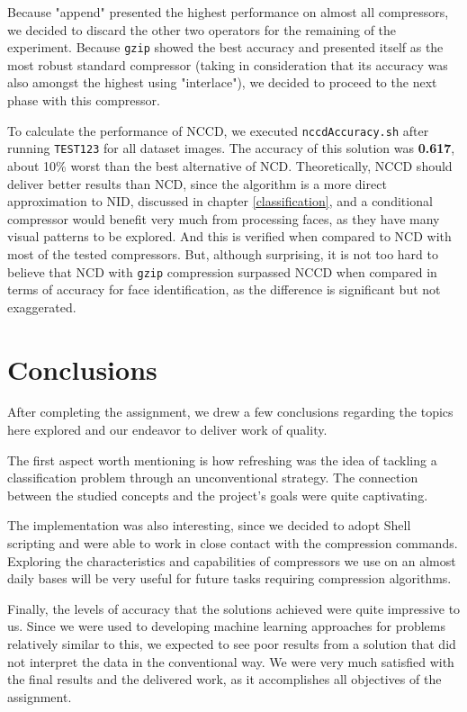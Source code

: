\documentclass[12pt]{article}
\begin{document}
Because "append" presented the highest performance on almost all compressors, we decided to discard the other two operators for the remaining of the experiment.
Because \texttt{gzip} showed the best accuracy and presented itself as the most robust standard compressor (taking in consideration that its accuracy was also
amongst the highest using "interlace"), we decided to proceed to the next phase with this compressor.
\newline 

To calculate the performance of NCCD, we executed \texttt{nccdAccuracy.sh} after running \texttt{TEST123} for all dataset images.
The accuracy of this solution was \textbf{0.617}, about 10\% worst than the best alternative of NCD.
Theoretically, NCCD should deliver better results than NCD, since the algorithm is a more direct approximation to NID, discussed in chapter \ref{classification},
and a conditional compressor would benefit very much from processing faces, as they have many visual patterns to be explored.
And this is verified when compared to NCD with most of the tested compressors.
But, although surprising, it is not too hard to believe that NCD with \texttt{gzip} compression surpassed NCCD when compared in terms of accuracy for face 
identification, as the difference is significant but not exaggerated.

\newpage
\section{Conclusions} %

After completing the assignment, we drew a few conclusions regarding the topics here explored and our endeavor to deliver work of quality.

The first aspect worth mentioning is how refreshing was the idea of tackling a classification problem through an unconventional strategy.
The connection between the studied concepts and the project's goals were quite captivating.

The implementation was also interesting, since we decided to adopt Shell scripting and were able to work in close contact with the compression commands.
Exploring the characteristics and capabilities of compressors we use on an almost daily bases will be very useful for future tasks requiring compression algorithms.

Finally, the levels of accuracy that the solutions achieved were quite impressive to us.
Since we were used to developing machine learning approaches for problems relatively similar to this, we expected to see poor results from a solution that did 
not interpret the data in the conventional way.
We were very much satisfied with the final results and the delivered work, as it accomplishes all objectives of the assignment.
\end{document}
